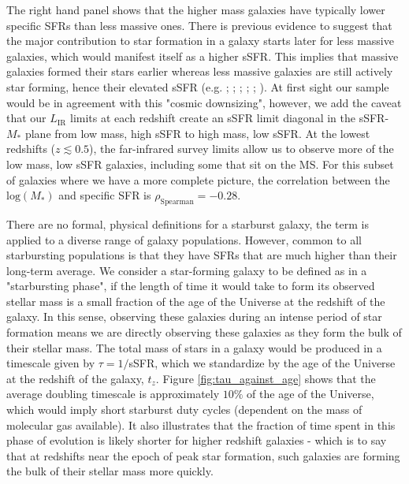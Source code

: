 The right hand panel shows that the higher mass galaxies have typically lower specific SFRs than less massive ones. There is previous evidence to suggest that the major contribution to star formation in a galaxy starts later for less massive galaxies, which would manifest itself as a higher sSFR. This implies that massive galaxies formed their stars earlier whereas less massive galaxies are still actively star forming, hence their elevated sSFR (e.g. \citealt{Brinchmann_2000}; \citealt{Juneau_2005}; \citealt{Bell_2005}; \citealt{caputi_2006}; \citealt{Reddy_2006}; \citealt{Noeske_2007}). At first sight our sample would be in agreement with this "cosmic downsizing", however, we add the caveat that our $L_{\textrm{IR}}$ limits at each redshift create an sSFR limit diagonal in the sSFR-$M_*$ plane from low mass, high sSFR to high mass, low sSFR. At the lowest redshifts ($z \lesssim 0.5$), the far-infrared survey limits allow us to observe more of the low mass, low sSFR galaxies, including some that sit on the MS. For this subset of galaxies where we have a more complete picture, the correlation between the $\textrm{log}(M_*)$ and specific SFR is $\rho_{\textrm{Spearman}} = -0.28$.

There are no formal, physical definitions for a starburst galaxy, the term is applied to a diverse range of galaxy populations. However, common to all starbursting populations is that they have SFRs that are much higher than their long-term average. We consider a star-forming galaxy to be defined as in a "starbursting phase", if the length of time it would take to form its observed stellar mass is a small fraction of the age of the Universe at the redshift of the galaxy. In this sense, observing these galaxies during an intense period of star formation means we are directly observing these galaxies as they form the bulk of their stellar mass. The total mass of stars in a galaxy would be produced in a timescale given by $\tau = 1/$sSFR, which we standardize by the age of the Universe at the redshift of the galaxy, $t_z$. Figure \ref{fig:tau_against_age} shows that the average doubling timescale is approximately $10\%$ of the age of the Universe, which would imply short starburst duty cycles (dependent on the mass of molecular gas available). It also illustrates that the fraction of time spent in this phase of evolution is likely shorter for higher redshift galaxies - which is to say that at redshifts near the epoch of peak star formation, such galaxies are forming the bulk of their stellar mass more quickly.

